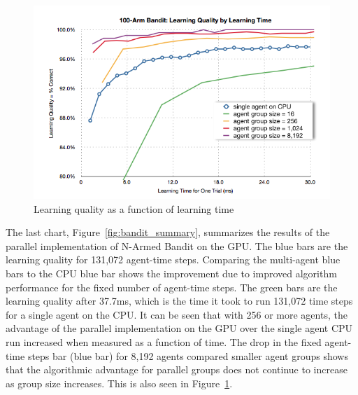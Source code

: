 \begin{figure}[hbtp]
\center
\includegraphics[scale=0.5]{fig03a}
\caption{Learning quality as a function of learning time}
\label{fig:bandit_time}
\end{figure}

\begin{flushleft}

The last chart, Figure~\ref{fig:bandit_summary}, summarizes the results of the parallel implementation of N-Armed Bandit on the GPU.  The blue bars are the learning quality for 131,072 agent-time steps.  Comparing the multi-agent blue bars to the CPU blue bar shows the improvement due to improved algorithm performance for the fixed number of agent-time steps.  The green bars are the learning quality after 37.7ms, which is the time it took to run 131,072 time steps for a single agent on the CPU.  It can be seen that with 256 or more agents, the advantage of the parallel implementation on the GPU over the single agent CPU run increased when measured as a function of time.  The drop in the fixed agent-time steps bar (blue bar) for 8,192 agents compared smaller agent groups shows that the algorithmic advantage for parallel groups does not continue to increase as group size increases.  This is also seen in Figure~\ref{fig:bandit_time}.



\end{flushleft}

